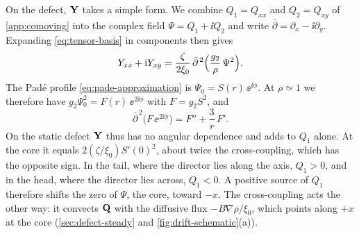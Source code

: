 \documentclass[aps,pre,reprint,superscriptaddress,longbibliography,nofootinbib
]{revtex4-2}
\begin{document}
On the defect, $\mathbf{Y}$ takes a simple form. We combine
$Q_1=Q_{xx}$ and $Q_2=Q_{xy}$ of \cref{app:comoving} into
the complex field $\Psi=Q_1+\ii Q_2$ and write
$\bar\partial=\partial_x-\ii\partial_y$. Expanding
\cref{eq:tensor-basis} in components then gives
\begin{equation}
  \label{eq:drift-complex}
  Y_{xx}+\mathrm{i} Y_{xy}=\frac{\zeta}{2\xi_0}\,\bar\partial^{\,2}\Bigl(\frac{g_2}{\rho}\,\Psi^2\Bigr).
\end{equation}
The Pad\'e profile \cref{eq:pade-approximation} is
$\Psi_0=S(r)\,\ee^{\ii\phi}$. At $\rho\simeq1$ we therefore
have $g_2\Psi_0^2=F(r)\,\ee^{2\ii\phi}$ with $F=g_2S^2$,
and
\begin{equation}
  \label{eq:drift-T-profile}
  \bar\partial^{\,2}\bigl(F\,\ee^{2\ii\phi}\bigr)=F''+\frac3r\,F' .
\end{equation}
On the static defect $\mathbf{Y}$ thus has no angular dependence
and adds to $Q_1$ alone. At the core it equals
$2(\zeta/\xi_0)S'(0)^2$, about twice the cross-coupling,
which has the opposite sign. In the tail, where the
director lies along the axis, $Q_1>0$, and in the head,
where the director lies across, $Q_1<0$. A positive source
of $Q_1$ therefore shifts the zero of $\Psi$, the core,
toward $-x$. The cross-coupling acts the other way: it
convects $\mathbf{Q}$ with the diffusive flux $-B\nabla\rho/\xi_0$,
which points along $+x$ at the core
(\cref{sec:defect-steady} and
\cref{fig:drift-schematic}(a)).
\end{document}
